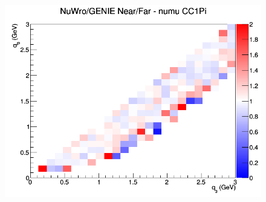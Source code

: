 \begin{figure}[h]
\endminipage
{}
\includegraphics[width=\linewidth]{q0_q3/nominal/ratios/CC1Pi_NuWro_GENIE_numu_NF_q3_q0.png}
\endminipage
\newline
\end{figure}
\clearpage
